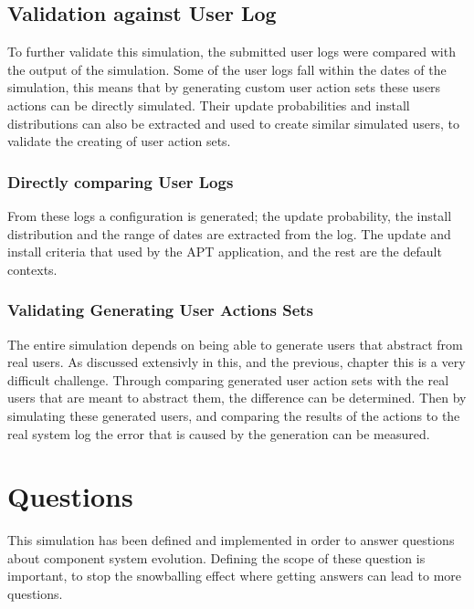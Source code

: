 
\subsection{Validation against User Log}
To further validate this simulation, the submitted user logs were compared with the output of the simulation.
Some of the user logs fall within the dates of the simulation, this means that by generating custom user action sets these users actions can be directly simulated.
Their update probabilities and install distributions can also be extracted and used to create similar simulated users, to validate the creating of user action sets.

\subsubsection{Directly comparing User Logs}
From these logs a configuration is generated; the update probability, the install distribution and the range of dates are extracted from the log.
The update and install criteria that used by the APT application, and the rest are the default contexts.  


\subsubsection{Validating Generating User Actions Sets}
The entire simulation depends on being able to generate users that abstract from real users.
As discussed extensivly in this, and the previous, chapter this is a very difficult challenge.
Through comparing generated user action sets with the real users that are meant to abstract them, the difference can be determined.
Then by simulating these generated users, and comparing the results of the actions to the real system log the error that is caused by the generation can be measured.  




\section{Questions}
This simulation has been defined and implemented in order to answer questions about component system evolution.
Defining the scope of these question is important, to stop the snowballing effect where getting answers can lead to more questions. 

